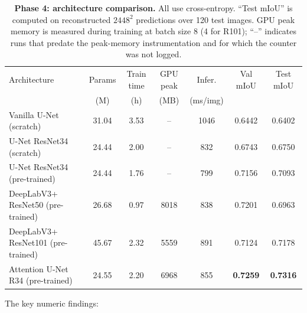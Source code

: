 \documentclass[conference,letterpaper,10pt]{IEEEtran}
\begin{document}
\begin{table}[!t]
\centering\small
\caption{\textbf{Phase 4: architecture comparison.} All use cross-entropy.
``Test mIoU'' is computed on reconstructed $2448^2$ predictions over 120
test images. GPU peak memory is measured during training at batch size 8
(4 for R101); ``--'' indicates runs that predate the peak-memory
instrumentation and for which the counter was not logged.}\label{tab:arch}
\begin{tabular}{l c c c c c c}
\toprule
Architecture & Params & Train time & GPU peak & Infer. & Val mIoU & Test mIoU \\
             & (M)    & (h)        & (MB)     & (ms/img) &       &           \\
\midrule
Vanilla U-Net (scratch)          & 31.04 & 3.53 & --   & 1046 & 0.6442 & 0.6402 \\
U-Net ResNet34 (scratch)         & 24.44 & 2.00 & --   &  832 & 0.6743 & 0.6750 \\
U-Net ResNet34 (pre-trained)     & 24.44 & 1.76 & --   &  799 & 0.7156 & 0.7093 \\
DeepLabV3+ ResNet50 (pre-trained)& 26.68 & 0.97 & 8018 &  838 & 0.7201 & 0.6963 \\
DeepLabV3+ ResNet101 (pre-trained)& 45.67 & 2.32 & 5559 &  891 & 0.7124 & 0.7178 \\
Attention U-Net R34 (pre-trained)& 24.55 & 2.20 & 6968 &  855 & \textbf{0.7259} & \textbf{0.7316} \\
\bottomrule
\end{tabular}
\end{table}

The key numeric findings:
\end{document}
